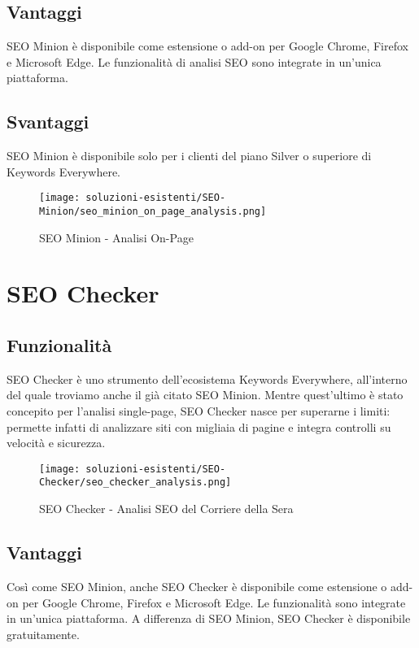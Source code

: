 \subsection{Vantaggi}
\par SEO Minion è disponibile come estensione o add-on per Google Chrome, Firefox e Microsoft Edge. Le funzionalità di analisi SEO sono integrate in un'unica piattaforma.

\subsection{Svantaggi}
\par SEO Minion è disponibile solo per i clienti del piano Silver o superiore di Keywords Everywhere.

\begin{figure}[H]
    \centering 
    \texttt{[image: soluzioni-esistenti/SEO-Minion/seo\_minion\_on\_page\_analysis.png]} 
    \caption{SEO Minion - Analisi On-Page}
\end{figure}

\section{SEO Checker}

\subsection{Funzionalità}
\par SEO Checker è uno strumento dell’ecosistema Keywords Everywhere, all’interno del quale troviamo anche il già citato SEO Minion. Mentre quest’ultimo è stato concepito per l’analisi single-page, SEO Checker nasce per superarne i limiti: permette infatti di analizzare siti con migliaia di pagine e integra controlli su velocità e sicurezza.

\begin{figure}[H]
    \centering 
    \texttt{[image: soluzioni-esistenti/SEO-Checker/seo\_checker\_analysis.png]} 
    \caption{SEO Checker - Analisi SEO del Corriere della Sera}
\end{figure}

\subsection{Vantaggi}
\par Così come SEO Minion, anche SEO Checker è disponibile come estensione o add-on per Google Chrome, Firefox e Microsoft Edge. Le funzionalità sono integrate in un'unica piattaforma. A differenza di SEO Minion, SEO Checker è disponibile gratuitamente.

